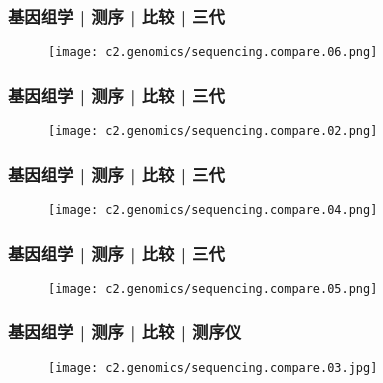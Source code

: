 \begin{frame}
  \frametitle{基因组学 | 测序 | 比较 | 三代}
  \begin{figure}
    \centering
    \texttt{[image: c2.genomics/sequencing.compare.06.png]}
  \end{figure}
\end{frame}


\begin{frame}
  \frametitle{基因组学 | 测序 | 比较 | 三代}
  \begin{figure}
    \centering
    \texttt{[image: c2.genomics/sequencing.compare.02.png]}
  \end{figure}
\end{frame}


\begin{frame}
  \frametitle{基因组学 | 测序 | 比较 | 三代}
  \begin{figure}
    \centering
    \texttt{[image: c2.genomics/sequencing.compare.04.png]}
  \end{figure}
\end{frame}

\begin{frame}
  \frametitle{基因组学 | 测序 | 比较 | 三代}
  \begin{figure}
    \centering
    \texttt{[image: c2.genomics/sequencing.compare.05.png]}
  \end{figure}
\end{frame}

\begin{frame}
  \frametitle{基因组学 | 测序 | 比较 | 测序仪}
  \begin{figure}
    \centering
    \texttt{[image: c2.genomics/sequencing.compare.03.jpg]}
  \end{figure}
\end{frame}

